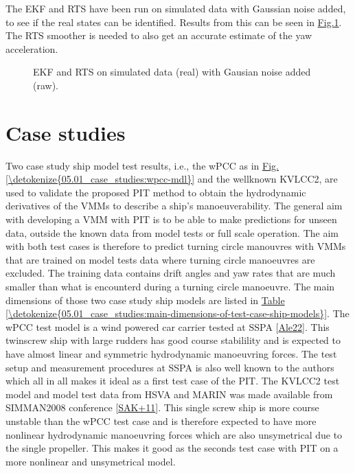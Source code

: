 \documentclass[review]{elsarticle}
\begin{document}
\sphinxAtStartPar
The EKF and RTS have been run on simulated data with Gaussian noise added, to see if the real states can be identified. Results from this can be seen in  \hyperref[\detokenize{04.01_EK:fig-ekf}]{Fig.\@ \ref{\detokenize{04.01_EK:fig-ekf}}}. The RTS smoother is needed to also get an accurate estimate of the yaw acceleration.

\begin{figure}[H]
\centering
\capstart

\noindent{}
\caption{EKF and RTS on simulated data (real) with Gausian noise added (raw).}\label{\detokenize{04.01_EK:fig-ekf}}\end{figure}


\section{Case studies}
\label{\detokenize{05.01_case_studies:case-studies}}\label{\detokenize{05.01_case_studies:id1}}\label{\detokenize{05.01_case_studies::doc}}
\sphinxAtStartPar
Two case study ship model test results, i.e., the wPCC as in \hyperref[\detokenize{05.01_case_studies:wpcc-mdl}]{Fig.\@ \ref{\detokenize{05.01_case_studies:wpcc-mdl}}} and the well\sphinxhyphen{}known KVLCC2, are used to validate the proposed PIT method to obtain the hydrodynamic derivatives of the VMMs to describe a ship’s manoeuverability. The general aim with developing a VMM with PIT is to be able to make predictions for unseen data, outside the known data from model tests or full scale operation. The aim with both test cases is therefore to predict turning circle manouvres with VMMs that are trained on model tests data where turning circle manoeuvres are excluded. The training data contains drift angles and yaw rates that are much smaller than what is encounterd during a turning circle manoeuvre.
The main dimensions of those two case study ship models are listed in \hyperref[\detokenize{05.01_case_studies:main-dimensions-of-test-case-ship-models}]{Table \ref{\detokenize{05.01_case_studies:main-dimensions-of-test-case-ship-models}}}. The wPCC test model is a wind powered car carrier tested at SSPA {[}\hyperlink{cite.bibligraphy:id86}{Ale22}{]}. This twin\sphinxhyphen{}screw ship with large rudders has good course stabilility and is expected to have almost linear and symmetric hydrodynamic manoeuvring forces. The test setup and measurement procedures at SSPA is also well known to the authors which all in all makes it ideal as a first test case of the PIT.
The KVLCC2 test model and model test data from HSVA and MARIN was made available from SIMMAN2008 conference {[}\hyperlink{cite.bibligraphy:id79}{SAK+11}{]}. This single screw ship is more course unstable than the wPCC test case and is therefore expected to have more nonlinear hydrodynamic manoeuvring forces which are also unsymetrical due to the single propeller. This makes it good as the seconds test case with PIT on a more nonlinear and unsymetrical model.
\end{document}
